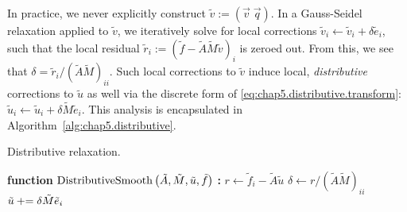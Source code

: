 In practice, we never explicitly construct $\tilde{v} := (\vec{v} \; \vec{q})$. In a Gauss-Seidel relaxation applied to $\tilde{v}$, we iteratively solve for local corrections $\tilde{v}_i \leftarrow \tilde{v}_i + \delta \tilde{e}_i$, such that the local residual $\tilde{r}_i := (\tilde{f} - \tilde{A} \tilde{M} \tilde{v})_i$ is zeroed out. From this, we see that $\delta = \tilde{r}_i / (\tilde{A} \tilde{M})_{ii}$. Such local corrections to $\tilde{v}$ induce local, \emph{distributive} corrections to $\tilde{u}$ as well via the discrete form of \eqref{eq:chap5.distributive.transform}: $\tilde{u}_i \leftarrow \tilde{u}_i + \delta \tilde{M} \tilde{e}_i$. This analysis is encapsulated in Algorithm~\ref{alg:chap5.distributive}.

\begin{algorithm}[htbp]
\caption{Distributive relaxation.}
\label{alg:chap5.distributive}
\begin{algorithmic}[1]
\STATE \textbf{function} $\operatorname{DistributiveSmooth} \left( \tilde{A}, \tilde{M}, \tilde{u}, \tilde{f} \right)$ \textbf{:}
        \STATE $r \leftarrow \tilde{f}_i - \tilde{A} \tilde{u}$
        \STATE $\delta \leftarrow r / (\tilde{A} \tilde{M})_{ii}$
        \STATE $\tilde{u} +{}\!\!\!= \delta \tilde{M} \tilde{e}_i$
    \ENDFOR
\ENDFOR
\end{algorithmic}
\end{algorithm}

